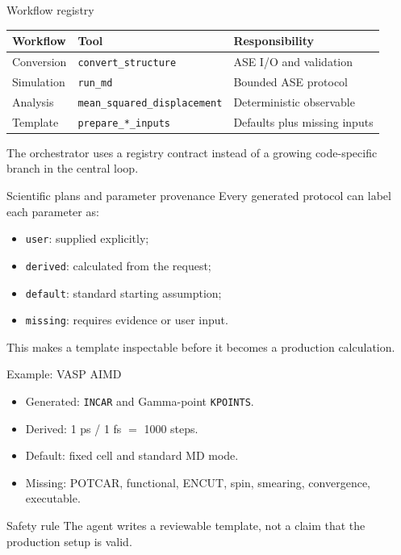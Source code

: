 \documentclass[aspectratio=169,11pt]{beamer}
\begin{document}
\begin{frame}{Workflow registry}
\begin{center}
\begin{tabular}{lll}
\toprule
Workflow & Tool & Responsibility\\
\midrule
Conversion & \texttt{convert\_structure} & ASE I/O and validation\\
Simulation & \texttt{run\_md} & Bounded ASE protocol\\
Analysis & \texttt{mean\_squared\_displacement} & Deterministic observable\\
Template & \texttt{prepare\_*\_inputs} & Defaults plus missing inputs\\
\bottomrule
\end{tabular}
\end{center}
The orchestrator uses a registry contract instead of a growing code-specific branch in
the central loop.
\end{frame}

\begin{frame}{Scientific plans and parameter provenance}
Every generated protocol can label each parameter as:
\begin{itemize}
  \item \texttt{user}: supplied explicitly;
  \item \texttt{derived}: calculated from the request;
  \item \texttt{default}: standard starting assumption;
  \item \texttt{missing}: requires evidence or user input.
\end{itemize}
This makes a template inspectable before it becomes a production calculation.
\end{frame}

\begin{frame}{Example: VASP AIMD}
\begin{itemize}
  \item Generated: \texttt{INCAR} and Gamma-point \texttt{KPOINTS}.
  \item Derived: 1 ps / 1 fs $=$ 1000 steps.
  \item Default: fixed cell and standard MD mode.
  \item Missing: POTCAR, functional, ENCUT, spin, smearing, convergence, executable.
\end{itemize}
\begin{alertblock}{Safety rule}
The agent writes a reviewable template, not a claim that the production setup is valid.
\end{alertblock}
\end{frame}
\end{document}
